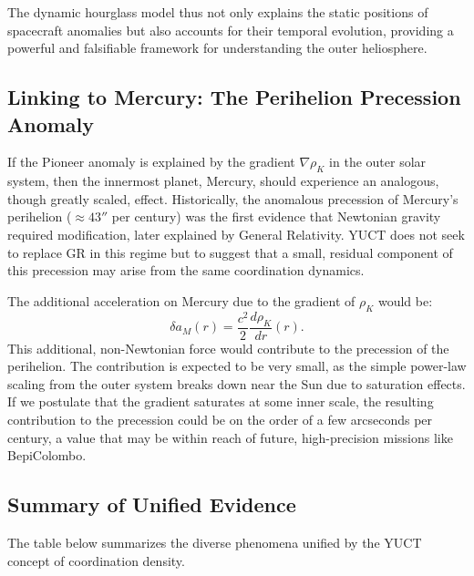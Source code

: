 \documentclass[12pt,a4paper]{article}
\theoremstyle{remark}
\begin{document}
	The dynamic hourglass model thus not only explains the static positions of spacecraft anomalies but also accounts for their temporal evolution, providing a powerful and falsifiable framework for understanding the outer heliosphere.
	
	\subsection{Linking to Mercury: The Perihelion Precession Anomaly}
	\label{subsec:coord:mercury}
	
	If the Pioneer anomaly is explained by the gradient $\nabla \rho_K$ in the outer solar system, then the innermost planet, Mercury, should experience an analogous, though greatly scaled, effect. Historically, the anomalous precession of Mercury's perihelion ($ \approx 43''$ per century) was the first evidence that Newtonian gravity required modification, later explained by General Relativity. YUCT does not seek to replace GR in this regime but to suggest that a small, residual component of this precession may arise from the same coordination dynamics.
	
	The additional acceleration on Mercury due to the gradient of $\rho_K$ would be:
	\begin{equation}
		\delta a_M(r) = \frac{c^2}{2} \frac{d\rho_K}{dr}(r).
	\end{equation}
	This additional, non-Newtonian force would contribute to the precession of the perihelion. The contribution is expected to be very small, as the simple power-law scaling from the outer system breaks down near the Sun due to saturation effects. If we postulate that the gradient saturates at some inner scale, the resulting contribution to the precession could be on the order of a few arcseconds per century, a value that may be within reach of future, high-precision missions like BepiColombo.
	
	\subsection{Summary of Unified Evidence}
	
	The table below summarizes the diverse phenomena unified by the YUCT concept of coordination density.
	
\end{document}
